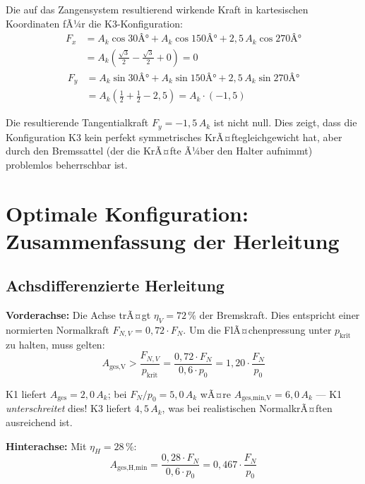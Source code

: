 ﻿\documentclass[12pt,a4paper]{article}
\theoremstyle{definition}
\begin{document}
Die auf das Zangensystem resultierend wirkende Kraft in kartesischen
Koordinaten fÃ¼r die K3-Konfiguration:
\begin{align}
  F_x &= A_k \cos 30Â° + A_k \cos 150Â° + 2{,}5\,A_k \cos 270Â° \\
      &= A_k \!\left(\tfrac{\sqrt{3}}{2} - \tfrac{\sqrt{3}}{2} + 0\right) = 0
      \label{eq:Fx_K3}
\end{align}
\begin{align}
  F_y &= A_k \sin 30Â° + A_k \sin 150Â° + 2{,}5\,A_k \sin 270Â° \\
      &= A_k \!\left(\tfrac{1}{2} + \tfrac{1}{2} - 2{,}5\right)
       = A_k \cdot (-1{,}5)
      \label{eq:Fy_K3}
\end{align}

Die resultierende Tangentialkraft $F_y = -1{,}5\,A_k$ ist nicht null.
Dies zeigt, dass die Konfiguration K3 kein perfekt symmetrisches
KrÃ¤ftegleichgewicht hat, aber durch den Bremssattel (der die KrÃ¤fte
Ã¼ber den Halter aufnimmt) problemlos beherrschbar ist.

\section{Optimale Konfiguration: Zusammenfassung der Herleitung}

\subsection{Achsdifferenzierte Herleitung}

\textbf{Vorderachse:}  Die Achse trÃ¤gt $\eta_V = 72\,\%$ der Bremskraft.
Dies entspricht einer normierten Normalkraft
$F_{N,V} = 0{,}72 \cdot F_N$.  Um die FlÃ¤chenpressung unter
$p_{\text{krit}}$ zu halten, muss gelten:
\begin{equation}
  A_{\text{ges,V}} > \frac{F_{N,V}}{p_{\text{krit}}}
  = \frac{0{,}72 \cdot F_N}{0{,}6 \cdot p_0}
  = 1{,}20 \cdot \frac{F_N}{p_0}
  \label{eq:A_V_min}
\end{equation}

K1 liefert $A_{\text{ges}} = 2{,}0\,A_k$; bei $F_N/p_0 = 5{,}0\,A_k$
wÃ¤re $A_{\text{ges,min,V}} = 6{,}0\,A_k$ --- K1 \emph{unterschreitet} dies!
K3 liefert $4{,}5\,A_k$, was bei realistischen NormalkrÃ¤ften ausreichend ist.

\textbf{Hinterachse:}  Mit $\eta_H = 28\,\%$:
\begin{equation}
  A_{\text{ges,H,min}} = \frac{0{,}28 \cdot F_N}{0{,}6 \cdot p_0}
  = 0{,}467 \cdot \frac{F_N}{p_0}
  \label{eq:A_H_min}
\end{equation}
\end{document}

